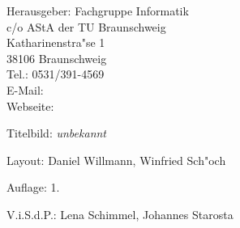 
\begin{nimpressum}
\item[Herausgeber:]
	Fachgruppe Informatik\\
	c/o AStA der TU Braunschweig\\
	Katharinenstra"se 1\\
	38106 Braunschweig\\
	Tel.: 0531/391-4569\\
	E-Mail: \\
	Webseite: 
\item[Titelbild:]
	\textit{unbekannt}
\item[Layout:]
	Daniel Willmann, Winfried Sch"och

%
\item[Auflage:]
  1.
\item[V.i.S.d.P.:]  %
  Lena Schimmel, Johannes Starosta
\end{nimpressum}

